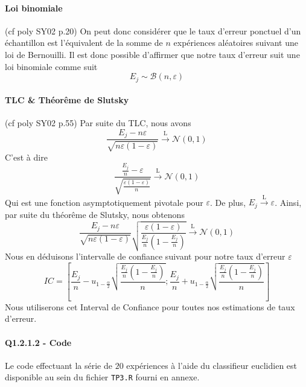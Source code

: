 \documentclass{report}
\begin{document}
\paragraph{Loi binomiale}
(cf poly SY02 p.20) On peut donc considérer que le taux d'erreur ponctuel d'un échantillon est l'équivalent de la somme de $n$ expériences aléatoires suivant une loi de Bernouilli. Il est donc possible d'affirmer que notre taux d'erreur suit une loi binomiale comme suit
$$ E_j \sim \mathcal{B}(n, \varepsilon)$$

\paragraph{TLC \& Théorême de Slutsky}
(cf poly SY02 p.55) Par suite du TLC, nous avons
$$ \frac{E_j - n \varepsilon}{\sqrt{n \varepsilon (1 - \varepsilon)}} \xrightarrow{\text{L}} \mathcal{N}(0,1)$$
C'est à dire
$$\frac{\frac{E_j}{n} - \varepsilon}{\sqrt{\frac{\varepsilon ( 1 - \varepsilon)}{n}}} \xrightarrow{\text{L}} \mathcal{N}(0,1)$$
Qui est une fonction asymptotiquement pivotale pour $\varepsilon$. De plus, $E_j \xrightarrow{\text{L}} \varepsilon$. Ainsi, par suite du théorême de Slutsky, nous obtenons
$$ \frac{E_j - n \varepsilon}{\sqrt{n \varepsilon (1 - \varepsilon)}} \sqrt{\frac{\varepsilon (1 - \varepsilon)}{\frac{E_j}{n} (1 - \frac{E_j}{n})}} \xrightarrow{\text{L}} \mathcal{N}(0,1) $$
Nous en déduisons l'intervalle de confiance suivant pour notre taux d'erreur $\varepsilon$
$$IC = [\frac{E_j}{n} - u_{1 - \frac{\alpha}{2}}\sqrt{\frac{\frac{E_j}{n} (1 - \frac{E_j}{n})}{n}} ; \frac{E_j}{n} + u_{1 - \frac{\alpha}{2}}\sqrt{\frac{\frac{E_j}{n} (1 - \frac{E_j}{n})}{n}}]$$
Nous utiliserons cet Interval de Confiance pour toutes nos estimations de taux d'erreur.

\paragraph{Q1.2.1.2 - Code}
Le code effectuant la série de $20$ expériences à l'aide du classifieur euclidien est disponible au sein du fichier \verb+TP3.R+ fourni en annexe.

\newpage
\end{document}
